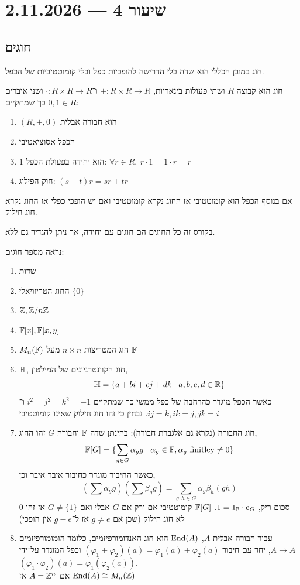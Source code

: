 \section{שיעור 4 --- 2.11.2026}
\subsection{חוגים}
חוג במובן הכללי הוא שדה בלי הדרישה להופכיות כפל ובלי קומוטטיביות של הכפל.
\begin{definition}[חוג]
	חוג הוא קבוצה $R$ ושתי פעולות בינאריות, $+ : R \times R \to R$ ו־$\cdot : R \times R \to R$ ושני איברים $0, 1 \in R$ כך שמתקיים:
	\begin{enumerate}
		\item $(R, +, 0)$ הוא חבורה אבלית
		\item הכפל אסוציאטיבי 
		\item $1$ הוא יחידה בפעולת הכפל: $\forall r \in R,\ r \cdot 1 = 1 \cdot r = r$
		\item חוק הפילוג: $(s + t) r = s r + t r$
	\end{enumerate}
	אם בנוסף הכפל הוא קומוטטיבי אז החוג נקרא קומוטטיבי ואם יש הופכי כפלי אז החוג נקרא חוג חילוק.
\end{definition}
\begin{remark}
	בקורס זה כל החוגים הם חוגים עם יחידה, אך ניתן להגדיר גם ללא.
\end{remark}
\begin{example}
	נראה מספר חוגים:
	\begin{enumerate}
		\item שדות
		\item החוג הטריוויאלי $\{ 0 \}$
		\item $\mathbb{Z}, \mathbb{Z} / n \mathbb{Z}$
		\item $\mathbb{F}[x], \mathbb{F}[x, y]$
		\item $M_n(\mathbb{F})$ חוג המטריצות $n \times n$ מעל $\mathbb{F}$
		\item $\mathbb{H}$, חוג הקוונטרניונים של המילטון,
			\[
				\mathbb{H}
				= \{ a + b i + c j + d k \mid a, b, c, d \in \mathbb{R} \}
			\]
			כאשר הכפל מוגדר כהרחבה של כפל ממשי כך שמתקיים $i^2 = j^2 = k^2 = -1$ ו־$i j = k, i k = j, j k  = i$.
			נבחין כי זהו חוג חילוק שאינו קומוטטיבי
		\item חוג החבורה (נקרא גם אלגברת חבורה):
			בהינתן שדה $\mathbb{F}$ וחבורה $G$ זהו החוג,
			\[
				\mathbb{F}[G]
				= \{ \sum_{g \in G} \alpha_g g \mid \alpha_g \in \mathbb{F}, \alpha_g \text{ finitley} \ne 0 \}
			\]
			כאשר החיבור מוגדר כחיבור איבר איבר וכן,
			\[
				\left(\sum \alpha_g g\right) \left(\sum \beta_g g\right)
				= \sum_{g, h \in G} \alpha_g \beta_h (g h)
			\]
			$0$ סכום ריק, $1 = 1_{\mathbb{F}} \cdot e_G$.
			$\mathbb{F}[G]$ קומוטטיבי אם ורק אם $G$ אבלי ואם $G \ne \{ 1 \}$ אז זהו לא חוג חילוק (שכן אם $g \ne e$ אז ל־$g - e$ אין הופכי)
		\item עבור חבורה אבלית $A$, $\operatorname{End}(A)$ הוא חוג האנדומורפיזמים, כלומר הומומורפיזמים $A \to A$,
			יחד עם חיבור $(\varphi_1 + \varphi_2)(a) = \varphi_1(a) + \varphi_2(a)$ וכפל המוגדר על־ידי $(\varphi_1 \cdot \varphi_2)(a) = \varphi_1(\varphi_2(a))$. \\
			אם $A = \mathbb{Z}^n$ אז $\operatorname{End}(A) \cong M_n(\mathbb{Z})$
	\end{enumerate}
\end{example}
